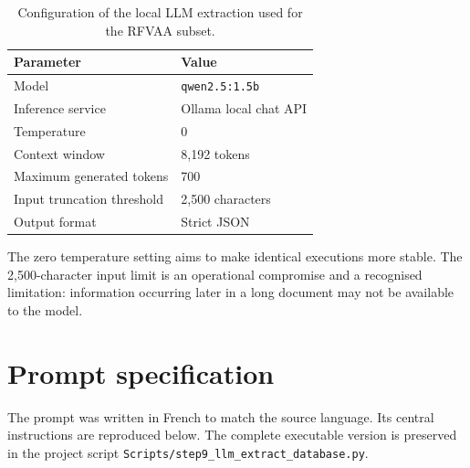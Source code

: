 \documentclass[
11pt,
english,
singlespacing,
headsepline,
]{MastersDoctoralThesis}
\begin{document}
\begin{table}[H]
\centering
\begin{tabular}{ll}
\toprule
Parameter & Value \\
\midrule
Model & \texttt{qwen2.5:1.5b} \\
Inference service & Ollama local chat API \\
Temperature & 0 \\
Context window & 8,192 tokens \\
Maximum generated tokens & 700 \\
Input truncation threshold & 2,500 characters \\
Output format & Strict JSON \\
\bottomrule
\end{tabular}
\caption{Configuration of the local LLM extraction used for the RFVAA subset.}
\label{tab:appendix-llm-configuration}
\end{table}

The zero temperature setting aims to make identical executions more stable.
The 2,500-character input limit is an operational compromise and a recognised
limitation: information occurring later in a long document may not be available
to the model.

\section{Prompt specification}

The prompt was written in French to match the source language. Its central
instructions are reproduced below. The complete executable version is preserved
in the project script \texttt{Scripts/step9\_llm\_extract\_database.py}.
\end{document}
